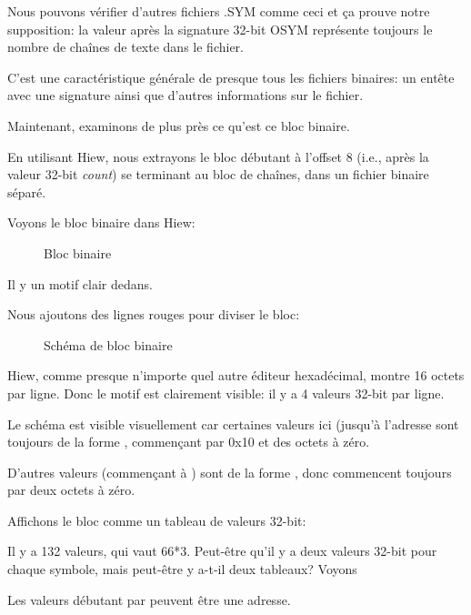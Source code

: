 Nous pouvons vérifier d'autres fichiers .SYM comme ceci et ça prouve notre supposition:
la valeur après la signature 32-bit OSYM représente toujours le nombre de chaînes
de texte dans le fichier.

C'est une caractéristique générale de presque tous les fichiers binaires: un entête
avec une signature ainsi que d'autres informations sur le fichier.

Maintenant, examinons de plus près ce qu'est ce bloc binaire.

En utilisant Hiew, nous extrayons le bloc débutant à l'offset 8 (i.e., après la valeur
32-bit \emph{count}) se terminant au bloc de chaînes, dans un fichier binaire
séparé.

\clearpage
Voyons le bloc binaire dans Hiew:

\begin{figure}[H]
\centering
{}
\caption{Bloc binaire}
\label{fig:oracle_SYM_binary1}
\end{figure}

Il y un motif clair dedans.

\clearpage
Nous ajoutons des lignes rouges pour diviser le bloc:

\begin{figure}[H]
\centering
{}
\caption{Schéma de bloc binaire}
\label{fig:oracle_SYM_binary2}
\end{figure}

Hiew, comme presque n'importe quel autre éditeur hexadécimal, montre 16 octets
par ligne.
Donc le motif est clairement visible:
il y a 4 valeurs 32-bit par ligne.

Le schéma est visible visuellement car certaines valeurs ici (jusqu'à l'adresse
 sont toujours de la forme , commençant par 0x10 et
des octets à zéro.

D'autres valeurs (commençant à ) sont de la forme ,
donc commencent toujours par deux octets à zéro.

Affichons le bloc comme un tableau de valeurs 32-bit:



Il y a 132 valeurs, qui vaut 66*3.
Peut-être qu'il y a deux valeurs 32-bit pour chaque symbole, mais peut-être y
a-t-il deux tableaux?
Voyons

Les valeurs débutant par  peuvent être une adresse.


